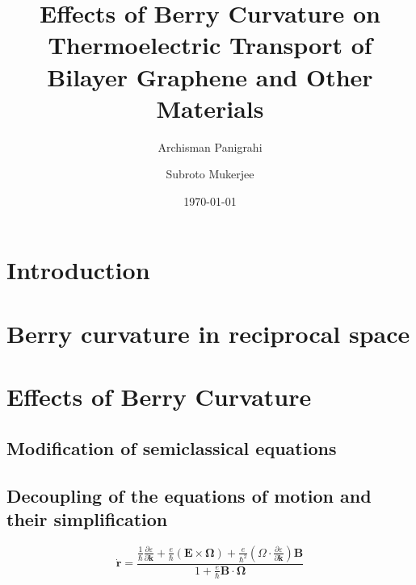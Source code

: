 \documentclass[aps,pra,amsmath,amssymb,floatfix,twocolumn, amsmath, superscriptaddress, twocolumn]{revtex4-2}
\newcommand{\bvec}[1]{{\mathbf #1}}
\begin{document}
\title{\bf Effects of Berry Curvature on Thermoelectric Transport of Bilayer Graphene and Other Materials}


\author{Archisman Panigrahi}


\author{Subroto Mukerjee}



\date{\today}

\begin{abstract}

\end{abstract}

\maketitle

\onecolumngrid



\section{Introduction}
\section{Berry curvature in reciprocal space}
\section{Effects of Berry Curvature}
\subsection{Modification of semiclassical equations}
\subsection{Decoupling of the equations of motion and their simplification}
\begin{equation}
\dot{\bvec{r}} = \frac{\frac{1}{\hbar} \frac{\partial \varepsilon}{\partial \bvec{k}} + \frac{e}{\hbar} (\bvec{E}\times\bvec{\Omega}) + \frac{e}{\hbar^2} (\Omega \cdot \frac{\partial \varepsilon}{\partial \bvec{k}} )\bvec{B}}{1 + \frac{e}{\hbar} \bvec{B}\cdot\bvec{\Omega}}
\end{equation}
\end{document}
